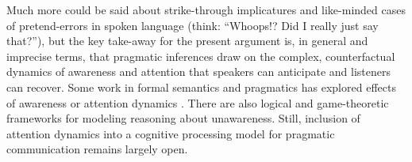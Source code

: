 \documentclass[fleqn,reqno,12pt]{article}
\newcommand{\real}{\acro{real}}
\begin{document}
Much more could be said about strike-through implicatures and like-minded cases of pretend-errors in spoken language (think: ``Whoops!? Did I really just say that?''), but the key take-away for the present argument is, in general and imprecise terms, that pragmatic inferences draw on the complex, counterfactual dynamics of awareness and attention that speakers can anticipate and listeners can recover.
Some work in formal semantics and pragmatics has explored effects of awareness or attention dynamics \citep[e.g.,][]{Jagerde-Jager2009:Attention-Aware,Kaufmann2009:Doch-Ja-Awarene,Crone2019:Assertions-of-C,Klecha2018:On-unidirection,Westera2022:Attentional-Pra}.
There are also logical \citep[e.g.,][]{FaginHalpern_1988:BeliefAwareness,Halpern2001:Alternative-Sem,HeifetzMeier2006:Interactive-Una,HeifetzMeier2008:A-Canonical-Mod} and game-theoretic \citep[e.g.,][]{Feinberg2004:Subjective-Reas,HeifetzMeier2007:Unawareness-Bel,Franke2012:Pragmatic-Reaso} frameworks for modeling reasoning about unawareness.
Still, inclusion of attention dynamics into a \real cognitive processing model for pragmatic communication remains largely open.
\end{document}
